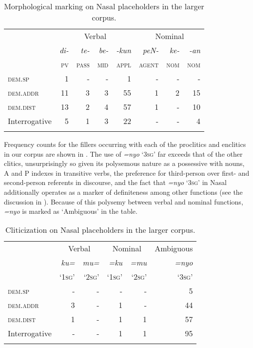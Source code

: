 \documentclass[output=paper,colorlinks,citecolor=brown
\ChapterDOI{10.5281/zenodo.15697585}
]{langscibook}
\begin{document}
\begin{table}
    \caption{Morphological marking on Nasal placeholders in the larger corpus.}
    \label{tab:billings:filler-morph}
    \begin{tabular}{l r r r r  r r r}
        \lsptoprule
        & \multicolumn{4}{c}{Verbal} & \multicolumn{3}{c}{Nominal} \\ \cmidrule(lr){2-5} \cmidrule(lr){6-8}
        & {\textit{di-}} & {\textit{te-}} & {\textit{be-}} & {\textit{-kun}} & {\textit{peN-}} & {\textit{ke-}} & {\textit{-an}} \\
        & {\textsc{pv}} & {\textsc{pass}} & {\textsc{mid}} & {\textsc{appl}} & {\textsc{agent}} & {\textsc{nom}} & {\textsc{nom}} \\
        \midrule
        \textsc{dem.sp} & 1 & - & - & 1 & - & - & - \\
        \textsc{dem.addr} & 11 & 3 & 3 & 55 & 1 & 2 & 15 \\
        \textsc{dem.dist} & 13 & 2 & 4 & 57 & 1 & - & 10 \\
        Interrogative & 5 & 1 & 3 & 22 & - & - & 4 \\
        \lspbottomrule
    \end{tabular}
\end{table}

Frequency counts for the fillers occurring with each of the proclitics and enclitics in our corpus are shown in . The use of \textit{=nyo} `3\textsc{sg}' far exceeds that of the other clitics, unsurprisingly so given its polysemous nature as a possessive with nouns, A and P indexes in transitive verbs, the preference for third-person over first- and second-person referents in discourse, and the fact that \textit{=nyo} `3\textsc{sg}' in Nasal additionally operates as a marker of definiteness among other functions (see the discussion in ). Because of this polysemy between verbal and nominal functions, \textit{=nyo} is marked as `Ambiguous' in the table.

\begin{table}
    \caption{Cliticization on Nasal placeholders in the larger corpus.}
    \label{tab:billings:filler-clitic}
    \begin{tabular}{l r r  r r  r}
        \lsptoprule
        & \multicolumn{2}{c}{Verbal} & \multicolumn{2}{c}{Nominal} & Ambiguous \\ \cmidrule(lr){2-3} \cmidrule(lr) {4-5} \cmidrule(lr){6-6}
        & {\textit{ku=}} & {\textit{mu=}} & {\textit{=ku}} & {\textit{=mu}} & {\textit{=nyo}} \\
        & {`\textsc{1sg}'} & {`\textsc{2sg}'} & {`\textsc{1sg}'} & {`\textsc{2sg}'} & {`\textsc{3sg}'} \\
        \midrule
        \textsc{dem.sp} & - & - & - & - & 5 \\
        \textsc{dem.addr} & 3 & - & 1 & - & 44 \\
        \textsc{dem.dist} & 1 & - & 1 & 1 & 57 \\
        Interrogative & - & - & 1 & 1 & 95 \\
        \lspbottomrule
    \end{tabular}
\end{table}
\end{document}
